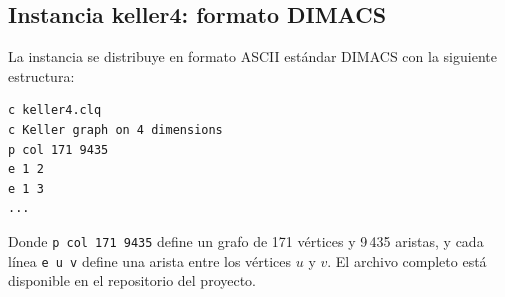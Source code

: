 \subsection{Instancia keller4: formato DIMACS}

La instancia se distribuye en formato ASCII estándar DIMACS con la siguiente estructura:

{\small
\begin{verbatim}
c keller4.clq
c Keller graph on 4 dimensions
p col 171 9435
e 1 2
e 1 3
...
\end{verbatim}
}

Donde \texttt{p col 171 9435} define un grafo de 171 vértices y 9\,435 aristas, y cada línea \texttt{e u v} define una arista entre los vértices $u$ y $v$. El archivo completo está disponible en el repositorio del proyecto.